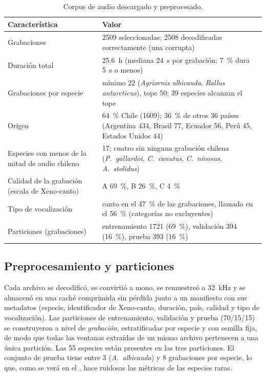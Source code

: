 \begin{table}[!htb]
  \centering\small
  \caption{Corpus de audio descargado y preprocesado.}
  \label{tab:corpus-audio}
  \begin{tabularx}{\textwidth}{@{}l X@{}}
    \toprule
    Característica & Valor \\
    \midrule
    Grabaciones & \num{2509} seleccionadas; \num{2508} decodificadas correctamente (una corrupta) \\
    Duración total & \SI{25,6}{\hour} (mediana \SI{24}{\second} por grabación; \SI{7}{\percent} dura \SI{5}{\second} o menos) \\
    Grabaciones por especie & mínimo 22 (\textit{Agriornis albicauda}, \textit{Rallus antarcticus}), tope 50; 39 especies alcanzan el tope \\
    Origen & \SI{64}{\percent} Chile (\num{1609}); \SI{36}{\percent} de otros 36 países (Argentina 434, Brasil 77, Ecuador 56, Perú 45, Estados Unidos 44) \\
    Especies con menos de la mitad de audio chileno & 17; cuatro sin ninguna grabación chilena (\textit{P.~gallardoi}, \textit{C.~canutus}, \textit{C.~nivosus}, \textit{A.~stolidus}) \\
    Calidad de la grabación (escala de Xeno-canto) & A \SI{69}{\percent}, B \SI{26}{\percent}, C \SI{4}{\percent} \\
    Tipo de vocalización & canto en el \SI{47}{\percent} de las grabaciones, llamado en el \SI{56}{\percent} (categorías no excluyentes) \\
    Particiones (grabaciones) & entrenamiento \num{1721} (\SI{69}{\percent}), validación 394 (\SI{16}{\percent}), prueba 393 (\SI{16}{\percent}) \\
    \bottomrule
  \end{tabularx}
\end{table}

\subsection{Preprocesamiento y particiones}

Cada archivo se decodificó, se convirtió a mono, se remuestreó a
\SI{32}{\kilo\hertz} y se almacenó en una caché comprimida sin pérdida
junto a un manifiesto con sus metadatos (especie, identificador de
Xeno-canto, duración, país, calidad y tipo de vocalización). Las particiones
de entrenamiento, validación y prueba (70/15/15) se construyeron a nivel de
\emph{grabación}, estratificadas por especie y con semilla fija, de modo que
todas las ventanas extraídas de un mismo archivo pertenecen a una única
partición. Las 55 especies están presentes en las tres
particiones. El conjunto de prueba tiene entre 3 (\textit{A.~albicauda}) y 8
grabaciones por especie, lo que, como se verá en el
, hace ruidosas las métricas de las especies raras.

